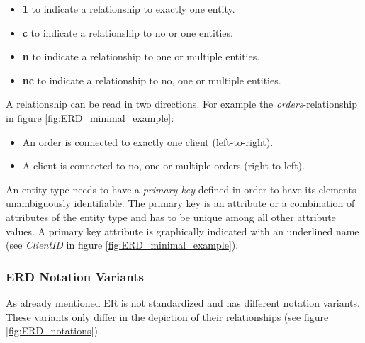\documentclass[twoside, openright, 12pt]{book}
\begin{document}
\begin{itemize}
\setlength\itemsep{0em}
\item \textbf{1} to indicate a relationship to exactly one entity.
\item \textbf{c} to indicate a relationship to no or one entities.
\item \textbf{n} to indicate a relationship to one or multiple entities.
\item \textbf{nc} to indicate a relationship to no, one or multiple entities.
\end{itemize}

\noindent
A relationship can be read in two directions.
For example the \textit{orders}-relationship in figure \ref{fig:ERD_minimal_example}:

\begin{itemize}
\setlength\itemsep{0em}
\item An order is connected to exactly one client (left-to-right).
\item A client is connceted to no, one or multiple orders (right-to-left).
\end{itemize}

\noindent
An entity type needs to have a \textit{primary key} defined in order to have its elements unambiguously identifiable.
The primary key is an attribute or a combination of attributes of the entity type and has to be unique among all other attribute values.
A primary key attribute is graphically indicated with an underlined name (see \textit{ClientID} in figure \ref{fig:ERD_minimal_example}).




\subsubsection{ERD Notation Variants}
\label{ERD_notations}
As already mentioned ER is not standardized and has different notation variants.
These variants only differ in the depiction of their relationships (see figure \ref{fig:ERD_notations}).
\end{document}
